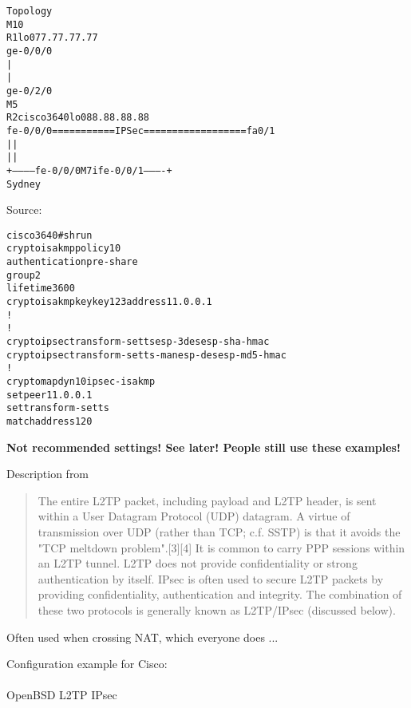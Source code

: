 \documentclass[Screen16to9,17pt]{foils}
\begin{document}

\begin{alltt}\small
Topology
  M10
  R1      lo0 77.77.77.77
ge-0/0/0
   |
   |
ge-0/2/0
  M5
  R2                                         cisco3640  lo0 88.88.88.88
fe-0/0/0  ===========IPSec==================    fa0/1
   |                                              |
   |                                              |
   +----------- fe-0/0/0  M7i  fe-0/0/1 ----------+
                        Sydney
\end{alltt}

Source:


\begin{alltt}\small
cisco3640#sh run
crypto isakmp policy 10
 authentication pre-share
 group 2
 lifetime 3600
crypto isakmp key key123 address 11.0.0.1
!
!
crypto ipsec transform-set ts esp-3des esp-sha-hmac
crypto ipsec transform-set ts-man esp-des esp-md5-hmac
!
crypto map dyn 10 ipsec-isakmp
 set peer 11.0.0.1
 set transform-set ts
 match address 120
\end{alltt}

\vskip 1cm
\centerline{\bf Not recommended settings! See later! People still use these examples!}



Description from
\begin{quote}\small
The entire L2TP packet, including payload and L2TP header, is sent within a User Datagram Protocol (UDP) datagram. A virtue of transmission over UDP (rather than TCP; c.f. SSTP) is that it avoids the "TCP meltdown problem".[3][4] It is common to carry PPP sessions within an L2TP tunnel. L2TP does not provide confidentiality or strong authentication by itself. IPsec is often used to secure L2TP packets by providing confidentiality, authentication and integrity. The combination of these two protocols is generally known as L2TP/IPsec (discussed below).
\end{quote}


Often used when crossing NAT, which everyone does ...

Configuration example for Cisco:\\
{\small {}}\\
OpenBSD L2TP IPsec\\
{\small{}}
\end{document}
